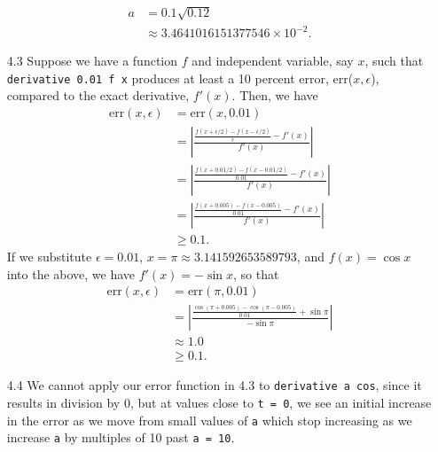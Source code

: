 \documentclass{article}
\begin{document}
\begin{itemize}
    \begin{equation*}
        \begin{split}
            a &= 0.1\sqrt{0.12} \\
            &\approx 3.4641016151377546 \times {10}^{-2}.
        \end{split}
    \end{equation*}
    \item[4.3]
    Suppose we have a function $f$ and independent variable, say $x$, such that 
    \verb|derivative 0.01 f x| produces at least a 10 percent error, err($x, \epsilon$), compared to 
    the exact derivative, $f'(x)$. Then, we have
    \begin{equation*}
        \begin{split}
            \text{err}(x, \epsilon) &= \text{err}(x, 0.01) \\ 
            &= \left| \frac{\frac{f(x + \epsilon/2) - f(x - \epsilon/2)}{\epsilon} - 
            f'(x)}{f'(x)} \right| \\
            &= \left| \frac{\frac{f(x + 0.01/2) - f(x - 0.01/2)}{0.01} - f'(x)}{f'(x)} \right| \\
            &= \left| \frac{\frac{f(x + 0.005) - f(x - 0.005)}{0.01} - f'(x)}{f'(x)} \right| \\
            &\geq 0.1.
        \end{split}
    \end{equation*}
    \qquad If we substitute $\epsilon = 0.01$, $x = \pi \approx 3.141592653589793$, and
    $f(x) = \cos{x}$ into the above, we have $f'(x) = -\sin{x}$, so that
    \begin{equation*}
        \begin{split}
            \text{err}(x, \epsilon) &= \text{err}(\pi, 0.01) \\ 
            &= \left| \frac{\frac{\cos{(\pi + 0.005)} - \cos{(\pi - 0.005)}}{0.01} 
            + \sin{\pi}}{-\sin{\pi}} \right| \\
            &\approx 1.0 \\
            &\geq 0.1.
        \end{split}
    \end{equation*}
    \item[4.4]
    We cannot apply our error function in 4.3 to \verb|derivative a cos|, since it results in 
    division by 0, but at values close to \verb|t = 0|, we see an initial increase in the error 
    as we move from small values of \verb|a| which stop increasing as we increase \verb|a| by 
    multiples of 10 past \verb|a = 10|.\par

\end{itemize}
\end{document}

